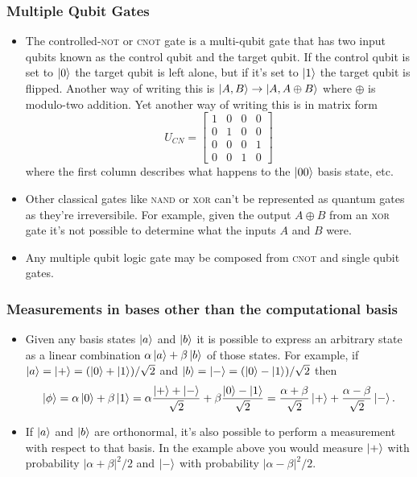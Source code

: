 \documentclass{article}
\begin{document}
\subsubsection{Multiple Qubit Gates}

\begin{itemize}
  \item The controlled-\textsc{not} or \textsc{cnot} gate is a multi-qubit gate that has two input qubits known as the control qubit and the target qubit. If the control qubit is set to $\ket{0}$ the target qubit is left alone, but if it's set to $\ket{1}$ the target qubit is flipped. Another way of writing this is $\ket{A, B} \rightarrow \ket{A, A \oplus B}$ where $\oplus$ is modulo-two addition. Yet another way of writing this is in matrix form \[U_{CN} = \begin{bmatrix}
            1 & 0 & 0 & 0 \\
            0 & 1 & 0 & 0 \\
            0 & 0 & 0 & 1 \\
            0 & 0 & 1 & 0
          \end{bmatrix}\] where the first column describes what happens to the $\ket{00}$ basis state, etc.

  \item Other classical gates like \textsc{nand} or \textsc{xor} can't be represented as quantum gates as they're irreversibile. For example, given the output $A \oplus B$ from an \textsc{xor} gate it's not possible to determine what the inputs $A$ and $B$ were.

  \item Any multiple qubit logic gate may be composed from \textsc{cnot} and single qubit gates.
\end{itemize}

\subsubsection{Measurements in bases other than the computational basis}

\begin{itemize}
  \item Given any basis states $\ket{a}$ and $\ket{b}$ it is possible to express an arbitrary state as a linear combination $\alpha \ket{a} + \beta \ket{b}$ of those states. For example, if $\ket{a} = \ket{+} = (\ket{0} + \ket{1}) / \sqrt{2}$ and $\ket{b} = \ket{-} = (\ket{0} - \ket{1}) / \sqrt{2}$ then \[\ket{\phi} = \alpha \ket{0} + \beta \ket{1} = \alpha \frac{\ket{+} + \ket{-}}{\sqrt{2}} + \beta \frac{\ket{0} - \ket{1}}{\sqrt{2}} = \frac{\alpha + \beta}{\sqrt{2}} \ket{+} + \frac{\alpha - \beta}{\sqrt{2}} \ket{-}.\]

  \item If $\ket{a}$ and $\ket{b}$ are orthonormal, it's also possible to perform a measurement with respect to that basis. In the example above you would measure $\ket{+}$ with probability $|\alpha + \beta|^2 / 2$ and $\ket{-}$ with probability $|\alpha - \beta|^2 / 2$.
\end{itemize}
\end{document}
